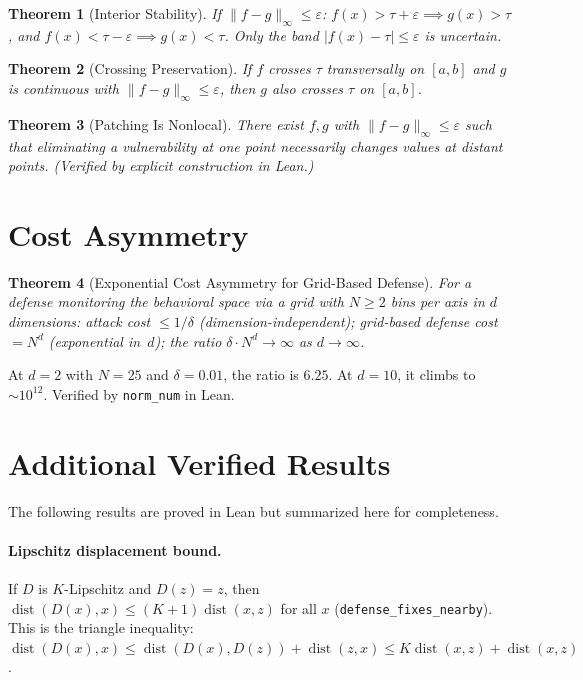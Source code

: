 \documentclass[11pt]{article}
\newtheorem{theorem}{Theorem}[section]
\newcommand{\dist}{\operatorname{dist}}
\begin{document}
\begin{theorem}[Interior Stability]
\label{thm:interior-stable}
If $\|f - g\|_\infty \leq \varepsilon$:
$f(x) > \tau + \varepsilon \implies g(x) > \tau$, and
$f(x) < \tau - \varepsilon \implies g(x) < \tau$.
Only the band $|f(x) - \tau| \leq \varepsilon$ is uncertain.
\end{theorem}

\begin{theorem}[Crossing Preservation]
\label{thm:crossing}
If $f$ crosses $\tau$ transversally on $[a,b]$ and $g$ is continuous
with $\|f - g\|_\infty \leq \varepsilon$, then $g$ also crosses $\tau$
on $[a,b]$.
\end{theorem}

\begin{theorem}[Patching Is Nonlocal]
\label{thm:nonlocal}
There exist $f, g$ with $\|f-g\|_\infty \leq \varepsilon$ such that
eliminating a vulnerability at one point necessarily changes values at
distant points. (Verified by explicit construction in Lean.)
\end{theorem}


\section{Cost Asymmetry}
\label{app:cost}

\begin{theorem}[Exponential Cost Asymmetry for Grid-Based Defense]
\label{thm:cost}
For a defense monitoring the behavioral space via a grid with
$N \geq 2$ bins per axis in $d$ dimensions: attack cost
$\leq 1/\delta$ (dimension-independent); grid-based defense cost
$= N^d$ (exponential in~$d$); the ratio
$\delta \cdot N^d \to \infty$ as $d\to\infty$.
\end{theorem}

At $d=2$ with $N=25$ and $\delta=0.01$, the ratio is $6.25$.
At $d=10$, it climbs to $\sim 10^{12}$. Verified by \texttt{norm\_num}
in Lean.


\section{Additional Verified Results}
\label{app:additional}

The following results are proved in Lean but summarized here for completeness.

\paragraph{Lipschitz displacement bound.}
If $D$ is $K$-Lipschitz and $D(z) = z$, then $\dist(D(x), x) \leq (K+1)\dist(x,z)$ for all $x$ (\texttt{defense\_fixes\_nearby}). This is the triangle inequality: $\dist(D(x), x) \leq \dist(D(x), D(z)) + \dist(z, x) \leq K\dist(x,z) + \dist(x,z)$.
\end{document}
